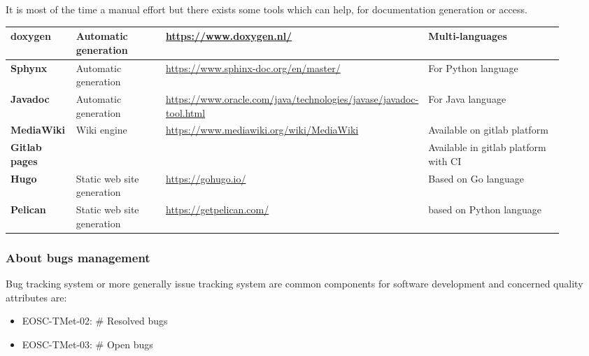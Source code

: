 It is most of the time a manual effort but there exists some tools
which can help, for documentation generation or access.

\begin{center}
    \tabletail{\hline}
    \label{tab:tools_pack}
    \small
    \begin{supertabular}{|p{0.12\linewidth}|p{0.2\linewidth}|p{0.25\linewidth}|p{0.35\linewidth}|} \hline
    \textbf{doxygen} & Automatic generation & \url{https://www.doxygen.nl/}
    & Multi-languages \\ \hline
    \textbf{Sphynx} & Automatic generation & \url{https://www.sphinx-doc.org/en/master/}
    & For Python language \\ \hline
    \textbf{Javadoc} & Automatic generation & \url{https://www.oracle.com/java/technologies/javase/javadoc-tool.html}
    & For Java language  \\ \hline


    \textbf{MediaWiki} & Wiki engine & \url{https://www.mediawiki.org/wiki/MediaWiki}
    &  Available on gitlab platform \\ \hline
    \textbf{Gitlab pages} &  & \url{}
    & Available in gitlab platform with CI  \\ \hline
    \textbf{Hugo} & Static web site generation & \url{https://gohugo.io/}
    &   Based on Go language \\ \hline
    \textbf{Pelican} & Static web site generation & \url{https://getpelican.com/}
    &  based on Python language \\ \hline


\end{supertabular}
\end{center}

\subsubsection{About bugs management}

Bug tracking system or more generally issue tracking system are
common components for software development and concerned quality
attributes are:

\begin{itemize}
  \item EOSC-TMet-02: \# Resolved bugs
  \item EOSC-TMet-03: \# Open bugs
\end{itemize}

